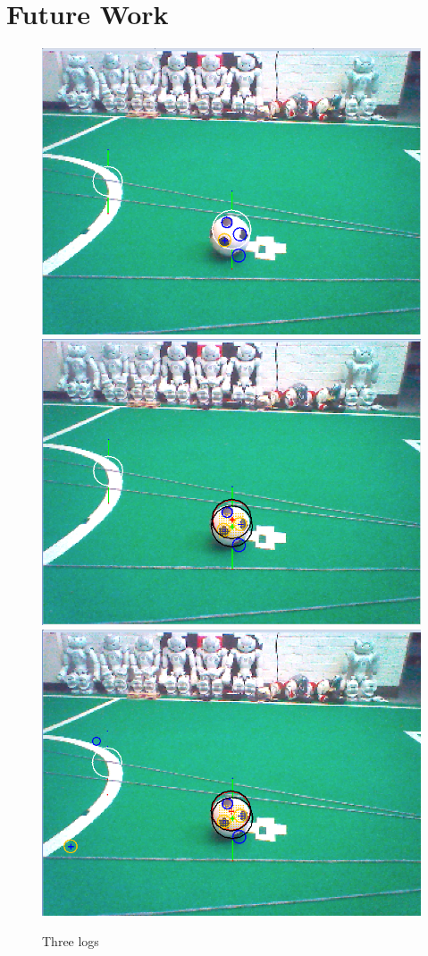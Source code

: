 \documentclass[11pt, twocolumn]{article}
\begin{document}
\section{Future Work}
\begin{figure}
\begin{center}
\includegraphics[scale=0.3]{s1.png}
\includegraphics[scale=0.3]{s2.png}
\includegraphics[scale=0.3]{s3.png}
\end{center}
\caption{Three logs}
\end{figure}
\end{document}
